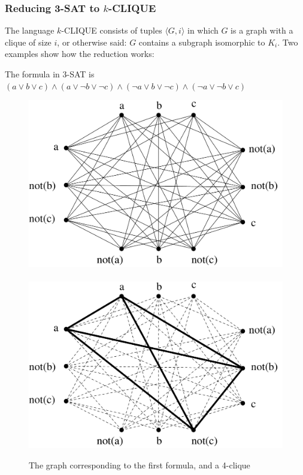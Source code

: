 \subsubsection{Reducing 3-SAT to $k$-CLIQUE}

The language $k$-CLIQUE consists of tuples $\langle G,i \rangle$
in which $G$ is a graph with a clique of size $i$, or otherwise said:
$G$ contains a subgraph isomorphic to $K_i$. Two examples show how the
reduction works:

\begin{vb}
The formula in 3-SAT is
$(a \vee b \vee c) \wedge (a \vee \neg b \vee \neg c) \wedge (\neg a \vee b \vee \neg c) \wedge (\neg a \vee \neg b \vee c)$

\begin{figure}[h]
\begin{center}
\includegraphics[height=0.2\textheight,keepaspectratio]{satclique}
~~~~~~~~~\includegraphics[height=0.2\textheight,keepaspectratio]{satcliquesol}
\caption{The graph corresponding to the first formula, and a 
4-clique}\label{satclique}
\end{center}
\end{figure}


\end{vb}

